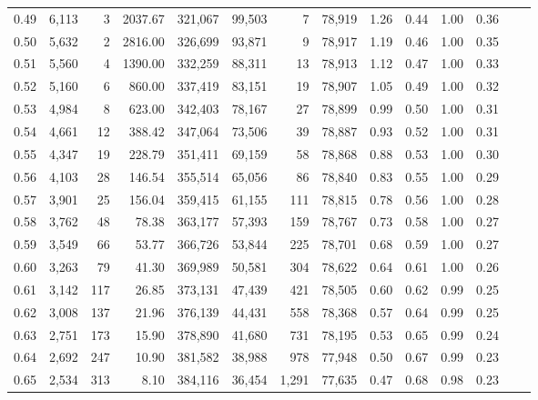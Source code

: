 \begin{tabular}{rrrrrrrrrrrrrr}
0.49 &  6,113 &      3 &  2037.67 &  321,067 &   99,503 &       7 &  78,919 &  1.26 &  0.44 &  1.00 &      0.36 \\
0.50 &  5,632 &      2 &  2816.00 &  326,699 &   93,871 &       9 &  78,917 &  1.19 &  0.46 &  1.00 &      0.35 \\
0.51 &  5,560 &      4 &  1390.00 &  332,259 &   88,311 &      13 &  78,913 &  1.12 &  0.47 &  1.00 &      0.33 \\
0.52 &  5,160 &      6 &   860.00 &  337,419 &   83,151 &      19 &  78,907 &  1.05 &  0.49 &  1.00 &      0.32 \\
0.53 &  4,984 &      8 &   623.00 &  342,403 &   78,167 &      27 &  78,899 &  0.99 &  0.50 &  1.00 &      0.31 \\
0.54 &  4,661 &     12 &   388.42 &  347,064 &   73,506 &      39 &  78,887 &  0.93 &  0.52 &  1.00 &      0.31 \\
0.55 &  4,347 &     19 &   228.79 &  351,411 &   69,159 &      58 &  78,868 &  0.88 &  0.53 &  1.00 &      0.30 \\
0.56 &  4,103 &     28 &   146.54 &  355,514 &   65,056 &      86 &  78,840 &  0.83 &  0.55 &  1.00 &      0.29 \\
0.57 &  3,901 &     25 &   156.04 &  359,415 &   61,155 &     111 &  78,815 &  0.78 &  0.56 &  1.00 &      0.28 \\
0.58 &  3,762 &     48 &    78.38 &  363,177 &   57,393 &     159 &  78,767 &  0.73 &  0.58 &  1.00 &      0.27 \\
0.59 &  3,549 &     66 &    53.77 &  366,726 &   53,844 &     225 &  78,701 &  0.68 &  0.59 &  1.00 &      0.27 \\
0.60 &  3,263 &     79 &    41.30 &  369,989 &   50,581 &     304 &  78,622 &  0.64 &  0.61 &  1.00 &      0.26 \\
0.61 &  3,142 &    117 &    26.85 &  373,131 &   47,439 &     421 &  78,505 &  0.60 &  0.62 &  0.99 &      0.25 \\
0.62 &  3,008 &    137 &    21.96 &  376,139 &   44,431 &     558 &  78,368 &  0.57 &  0.64 &  0.99 &      0.25 \\
0.63 &  2,751 &    173 &    15.90 &  378,890 &   41,680 &     731 &  78,195 &  0.53 &  0.65 &  0.99 &      0.24 \\
0.64 &  2,692 &    247 &    10.90 &  381,582 &   38,988 &     978 &  77,948 &  0.50 &  0.67 &  0.99 &      0.23 \\
0.65 &  2,534 &    313 &     8.10 &  384,116 &   36,454 &   1,291 &  77,635 &  0.47 &  0.68 &  0.98 &      0.23 \\

\end{tabular}
